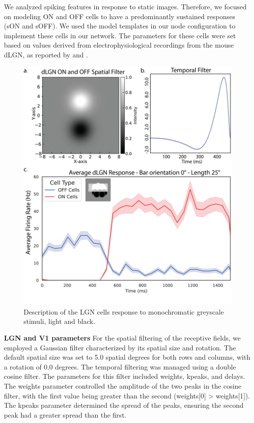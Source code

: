 \documentclass[12pt]{article}
\begin{document}
We analyzed spiking features in response to static images. Therefore, we focused on modeling ON and OFF cells to have a predominantly sustained responses (sON and sOFF). We used the model templates in our node configuration to implement these cells in our network. The parameters for these cells were set based on values derived from electrophysiological recordings from the mouse dLGN, as reported by \autocite{durandComparisonVisualResponse2016} and \autocite{billehSystematicIntegrationStructural2020}.

\begin{figure}[H]
  \centering
  \includegraphics[width=1.0 \textwidth]{figures/lgn_response_fig.png}
  \caption{Description of the LGN cells response to monochromatic greyscale stimuli, light and black.}
  \label{fig:LIF_connectivity}
\end{figure}

\textbf{LGN and V1 parameters} For the spatial filtering of the receptive fields, we employed a Gaussian filter characterized by its spatial size and rotation. The default spatial size was set to 5.0 spatial degrees for both rows and columns, with a rotation of 0.0 degrees. The temporal filtering was managed using a double cosine filter. The parameters for this filter included weights, kpeaks, and delays. The weights parameter controlled the amplitude of the two peaks in the cosine filter, with the first value being greater than the second (weights[0] > weights[1]). The kpeaks parameter determined the spread of the peaks, ensuring the second peak had a greater spread than the first.
\end{document}
